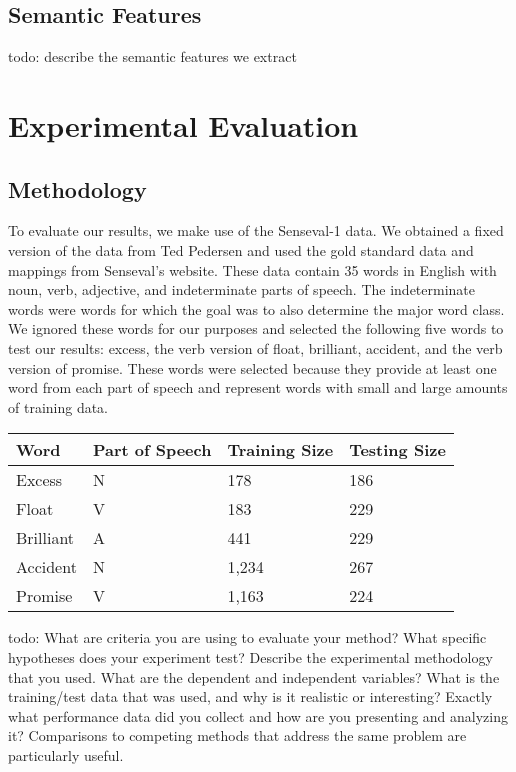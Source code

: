 \documentclass[12pt]{article}
\begin{document}
\subsection{Semantic Features}

todo: describe the semantic features we extract


\section{Experimental Evaluation}
\subsection{Methodology}

To evaluate our results, we make use of the Senseval-1 data. We obtained a fixed version of the data\cite{data} from Ted Pedersen and used the gold standard data and mappings from Senseval's website\cite{se}. These data contain 35 words in English with noun, verb, adjective, and indeterminate parts of speech. The indeterminate words were words for which the goal was to also determine the major word class. We ignored these words for our purposes and selected the following five words to test our results: excess, the verb version of float, brilliant, accident, and the verb version of promise. These words were selected because they provide at least one word from each part of speech and represent words with small and large amounts of training data.

\begin{table}[h]
\begin{tabular}{l|lll}
\hline
Word      & Part of Speech & Training Size & Testing Size \\ \hline
Excess    & N              & 178           & 186          \\
Float     & V              & 183           & 229          \\
Brilliant & A              & 441           & 229          \\ 
Accident  & N              & 1,234         & 267          \\
Promise   & V              & 1,163         &   224          
\end{tabular}
\end{table}

todo: What are criteria you are using to evaluate your method? What specific hypotheses does your experiment test? Describe the experimental methodology that you used. What are the dependent and independent variables? What is the training/test data that was used, and why is it realistic or interesting? Exactly what performance data did you collect and how are you presenting and analyzing it? Comparisons to competing methods that address the same problem are particularly useful.
\end{document}
